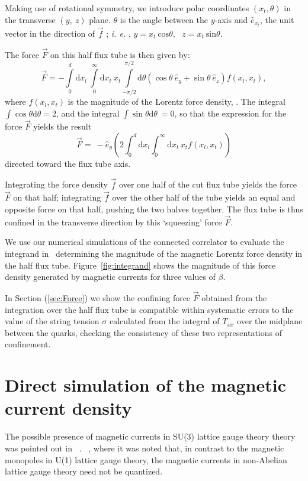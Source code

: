 \documentclass[pdftex,twocolumn,epjc3,envcountsect]{svjour3}
\newcommand{\Onlinecite}[1]{%
    \IfSubStr{#1}{,}{Refs}{Ref}.~\cite{#1}%
}
\begin{document}
Making use of rotational symmetry, we introduce polar coordinates $(x_t, \theta)$ in the transverse $(y,~z)$ plane.  $\theta$ is the angle between the $y$-axis and $\hat{e}_{x_t}$, the unit vector in the direction of $\vec{f}$ ; {\it{i. e.} }, $y = x_t ~\mathrm {cos} \theta,~~~z=x_t~ \mathrm{sin} \theta$.

The force $\vec{F}$ on this half flux tube
is then given by:
%
\begin{equation}
    \vec{F} = -\int\limits_0^d \mathrm{d}x_l~\int\limits_0^\infty \mathrm{d} x_t~x_t \int\limits_{-\pi/2}^{\pi/2} \mathrm{d}\theta  (\cos \theta ~\hat{e}_y + \sin \theta~ \hat{e}_z) f (x_l, x_t),
\end{equation}
where $f(x_l, x_t)$ is the magnitude of the Lorentz force density, .
%
The integral $\int \cos \theta \mathrm{d} \theta =2$, and the integral  $\int \sin \theta \mathrm{d} \theta 
~=0$, so that the expression for the force $\vec{F}$ yields the result
\begin {equation}
    \vec{F} =~- \hat{e}_y \left( 2 \int_0^d \mathrm{d}x_l \int_0^\infty \mathrm{d}x_t\, x_t f(x_l, x_t)\right)
    \label{vecF}
\end{equation}
directed toward the flux tube axis.

Integrating the force density $\vec{f}$ over one half of the cut flux tube yields the force $\vec{F}$ on that half; integrating $\vec{f}$ over the other half of the tube yields an equal and opposite force on that half, pushing the two halves together. The flux tube is thus confined in the transverse direction by this `squeezing' force $\vec{F}$. 

We use our numerical simulations of the connected correlator to evaluate the integrand in~ determining the magnitude of the magnetic Lorentz force density  in the half flux tube.  Figure~\ref{fig:integrand} shows the magnitude of this force density generated by magnetic currents for three values of $\beta$.

In Section (\ref{sec:Force}) we show the confining force $\vec{F}$ obtained from the integration  over the half flux tube is compatible within systematic errors to the value of the string tension $\sigma$ calculated from the integral  of $T_{xx}$ over the midplane between the quarks, checking the consistency of these two representations of confinement.



\section {Direct simulation of the magnetic current density}
\label{sec:magnetic}
The possible presence of magnetic currents in SU(3) lattice gauge theory theory was pointed out in~\Onlinecite{Skala:1996ar}, where it was noted that, in contrast to the magnetic monopoles in U(1) lattice gauge theory, the magnetic currents in non-Abelian lattice gauge theory need not be quantized.
\end{document}
